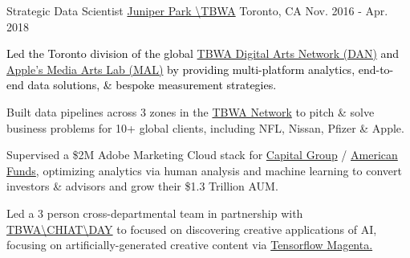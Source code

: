 \begin{cventries}
	\cventry
	{Strategic Data Scientist} %
	{\href{https://www.juniperparktbwa.com/}{Juniper Park \textbackslash  TBWA}} %
	{Toronto, CA} %
	{Nov. 2016 - Apr. 2018} %
	{
		\textcolor{black}{Led the Toronto division of the global \href{https://www.digitalartsnetwork.com/}{TBWA Digital Arts Network (DAN)} and \href{https://www.mediaartslab.com/}{Apple's Media Arts Lab (MAL)} by providing multi-platform analytics, end-to-end data solutions, \& bespoke measurement strategies.}
		\textcolor{text}{
			\begin{cvitems} %
				\item {Built data pipelines across 3 zones in the \href{https://tbwa.com/}{TBWA Network} to pitch \& solve business problems for 10+ global clients, including NFL, Nissan, Pfizer \& Apple.}
				\item {Supervised a \$2M Adobe Marketing Cloud stack for \href{https://www.capitalgroup.com/}{Capital Group} / \href{https://www.capitalgroup.com/advisor/}{American Funds}, optimizing analytics via human analysis and machine learning to convert investors \& advisors and grow their \$1.3 Trillion AUM.}
				\item {Led a 3 person cross-departmental team in partnership with \href{http://tbwachiatday.com/}{TBWA\textbackslash CHIAT\textbackslash DAY} to focused on discovering creative applications of AI, focusing on artificially-generated creative content via \href{https://magenta.tensorflow.org}{Tensorflow Magenta.}}
			\end{cvitems}
			\newline
		}
	}


\end{cventries}
